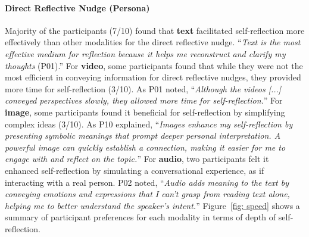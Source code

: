 \paragraph{Direct Reflective Nudge (Persona)}
Majority of the participants (7/10) found that \textbf{text} facilitated self-reflection more effectively than other modalities for the direct reflective nudge. ``\textit{Text is the most effective medium for reflection because it helps me reconstruct and clarify my thoughts} (P01).'' 
For \textbf{video}, some participants found that while they were not the most efficient in conveying information for direct reflective nudges, they provided more time for self-reflection (3/10). As P01 noted, ``\textit{Although the videos [...] conveyed perspectives slowly, they allowed more time for self-reflection.}'' %
For \textbf{image}, some participants found it beneficial for self-reflection by simplifying complex ideas (3/10). As P10 explained, ``\textit{Images enhance my self-reflection by presenting symbolic meanings that prompt deeper personal interpretation. A powerful image can quickly establish a connection, making it easier for me to engage with and reflect on the topic.}''
For \textbf{audio}, two participants felt it enhanced self-reflection by simulating a conversational experience, as if interacting with a real person. %
P02 noted, ``\textit{Audio adds meaning to the text by conveying emotions and expressions that I can’t grasp from reading text alone, helping me to better understand the speaker’s intent.}'' Figure~\ref{fig: speed} shows a summary of participant preferences for each modality in terms of depth of self-reflection.

